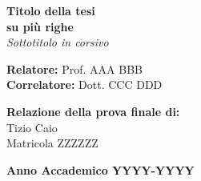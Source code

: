 \begin{titlepage}
		\vspace{10mm}
        
		\begin{center}
			\Huge{
				\textbf{Titolo della tesi \\ su più righe \\}
				}
			\Large{\textit{Sottotitolo in corsivo}}
		\end{center}
        
        \vspace{40mm}

        \begin{flushleft}
        

        \noindent
        {\large \textbf{Relatore:} Prof. AAA BBB } \\

        \noindent
        {\large \textbf{Correlatore:} Dott. CCC DDD}
        \end{flushleft}
        
        \vspace{10mm}

        \begin{flushright}
            {\large \textbf{Relazione della prova finale di:}} \\
            \large{Tizio Caio} \\
            \large{Matricola ZZZZZZ} 
        \end{flushright}
        
        \vspace{10mm}
        \begin{center}
            {\large{\bf Anno Accademico YYYY-YYYY}}
        \end{center}

        \restoregeometry
        
    \end{titlepage}
   
